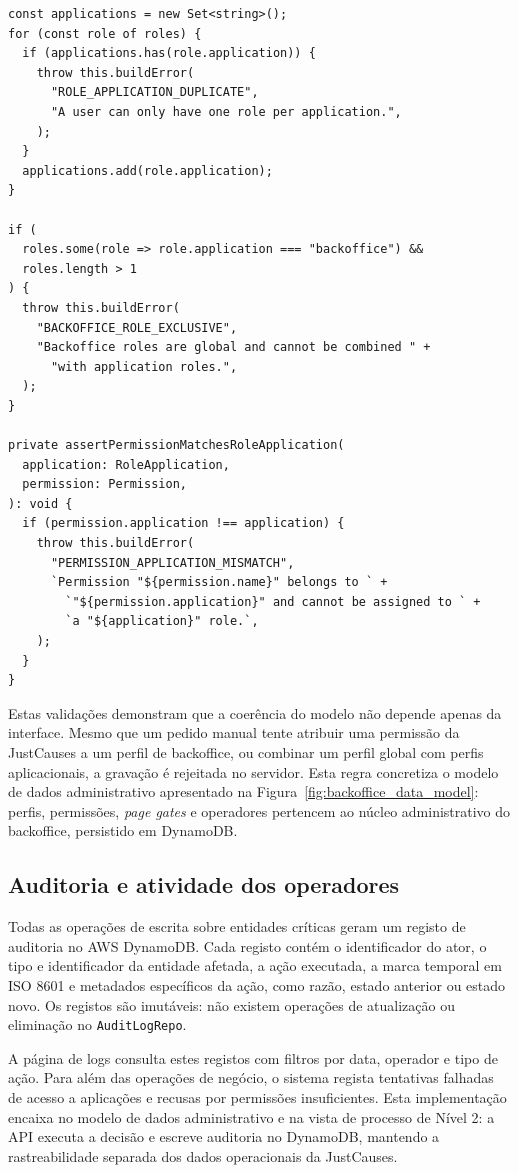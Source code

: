 \begin{lstlisting}[float, caption={Validações de perfis e permissões por aplicação}, label={lst:role_permission_validation}]
const applications = new Set<string>();
for (const role of roles) {
  if (applications.has(role.application)) {
    throw this.buildError(
      "ROLE_APPLICATION_DUPLICATE",
      "A user can only have one role per application.",
    );
  }
  applications.add(role.application);
}

if (
  roles.some(role => role.application === "backoffice") &&
  roles.length > 1
) {
  throw this.buildError(
    "BACKOFFICE_ROLE_EXCLUSIVE",
    "Backoffice roles are global and cannot be combined " +
      "with application roles.",
  );
}

private assertPermissionMatchesRoleApplication(
  application: RoleApplication,
  permission: Permission,
): void {
  if (permission.application !== application) {
    throw this.buildError(
      "PERMISSION_APPLICATION_MISMATCH",
      `Permission "${permission.name}" belongs to ` +
        `"${permission.application}" and cannot be assigned to ` +
        `a "${application}" role.`,
    );
  }
}
\end{lstlisting}

Estas validações demonstram que a coerência do modelo não depende apenas da interface. Mesmo que um pedido manual tente atribuir uma permissão da JustCauses a um perfil de backoffice, ou combinar um perfil global com perfis aplicacionais, a gravação é rejeitada no servidor. Esta regra concretiza o modelo de dados administrativo apresentado na Figura~\ref{fig:backoffice_data_model}: perfis, permissões, \textit{page gates} e operadores pertencem ao núcleo administrativo do backoffice, persistido em DynamoDB.

\subsection{Auditoria e atividade dos operadores}
\label{subsec:impl_audit}

Todas as operações de escrita sobre entidades críticas geram um registo de auditoria no AWS DynamoDB. Cada registo contém o identificador do ator, o tipo e identificador da entidade afetada, a ação executada, a marca temporal em ISO 8601 e metadados específicos da ação, como razão, estado anterior ou estado novo. Os registos são imutáveis: não existem operações de atualização ou eliminação no \texttt{AuditLogRepo}.

A página de logs consulta estes registos com filtros por data, operador e tipo de ação. Para além das operações de negócio, o sistema regista tentativas falhadas de acesso a aplicações e recusas por permissões insuficientes. Esta implementação encaixa no modelo de dados administrativo e na vista de processo de Nível 2: a \gls{API} executa a decisão e escreve auditoria no DynamoDB, mantendo a rastreabilidade separada dos dados operacionais da JustCauses.

